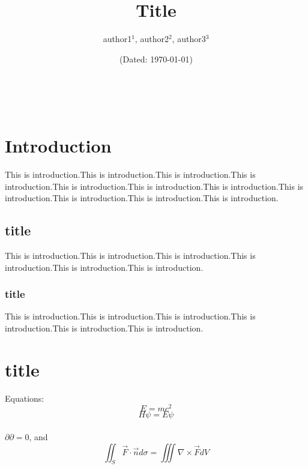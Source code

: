 \documentclass[hyperref]{ctexart}
\title{\textbf{Title}}
\author{\sffamily author1$^1$, \sffamily author2$^2$, \sffamily author3$^3$}
\date{(Dated: \today)}
\begin{document}
	\maketitle
		\\
	\begin{multicols}{2}
	\section{Introduction}\label{sec:introduction}
	This is introduction.This is introduction.This is introduction.This is introduction.This is introduction.This is introduction.This is introduction.This is introduction.This is introduction.This is introduction.This is introduction.
	\subsection{title}\label{subsec:title}
	This is introduction.This is introduction.This is introduction.This is introduction.This is introduction.This is introduction.
	\subsubsection{title}
	This is introduction.This is introduction.This is introduction.This is introduction.This is introduction.This is introduction.
	\section{title}\label{sec:title}
	\noindent Equations:
	\begin{equation}
		E=mc^2\label{eq:equation}
	\end{equation}
	\begin{equation}
		H\psi=E\psi\label{eq:equation2}
	\end{equation}\\
	$\partial\partial=0$, and
	\[\iint_S \vec{F}\cdot \vec{n}d\sigma=\iiint \nabla\times\vec{F}dV\]

\end{multicols}
\end{document}
